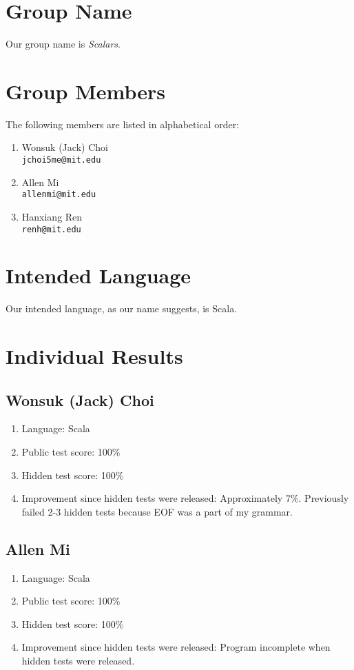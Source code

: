 \section{Group Name}

Our group name is \textit{Scalars}.

\section{Group Members}

The following members are listed in alphabetical order:
\begin{enumerate}
    \item Wonsuk (Jack) Choi \\ \texttt{jchoi5me@mit.edu}
    \item Allen Mi \\ \texttt{allenmi@mit.edu}
    \item Hanxiang Ren \\ \texttt{renh@mit.edu}
\end{enumerate}

\section{Intended Language}

Our intended language, as our name suggests, is Scala.

\section{Individual Results}

\subsection*{Wonsuk (Jack) Choi}
\begin{enumerate}
    \item Language: Scala
    \item Public test score: 100\%
    \item Hidden test score: 100\%
    \item Improvement since hidden tests were released: Approximately 7\%. Previously failed 2-3 hidden tests because EOF was a part of my grammar.
\end{enumerate}

\subsection*{Allen Mi}
\begin{enumerate}
    \item Language: Scala
    \item Public test score: 100\%
    \item Hidden test score: 100\%
    \item Improvement since hidden tests were released: Program incomplete when hidden tests were released.
\end{enumerate}

